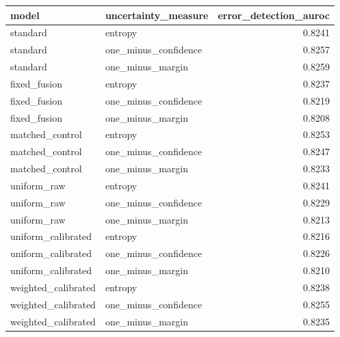 \begin{tabular}{llr}
\toprule
model & uncertainty\_measure & error\_detection\_auroc \\
\midrule
standard & entropy & 0.8241 \\
standard & one\_minus\_confidence & 0.8257 \\
standard & one\_minus\_margin & 0.8259 \\
fixed\_fusion & entropy & 0.8237 \\
fixed\_fusion & one\_minus\_confidence & 0.8219 \\
fixed\_fusion & one\_minus\_margin & 0.8208 \\
matched\_control & entropy & 0.8253 \\
matched\_control & one\_minus\_confidence & 0.8247 \\
matched\_control & one\_minus\_margin & 0.8233 \\
uniform\_raw & entropy & 0.8241 \\
uniform\_raw & one\_minus\_confidence & 0.8229 \\
uniform\_raw & one\_minus\_margin & 0.8213 \\
uniform\_calibrated & entropy & 0.8216 \\
uniform\_calibrated & one\_minus\_confidence & 0.8226 \\
uniform\_calibrated & one\_minus\_margin & 0.8210 \\
weighted\_calibrated & entropy & 0.8238 \\
weighted\_calibrated & one\_minus\_confidence & 0.8255 \\
weighted\_calibrated & one\_minus\_margin & 0.8235 \\
\bottomrule
\end{tabular}
